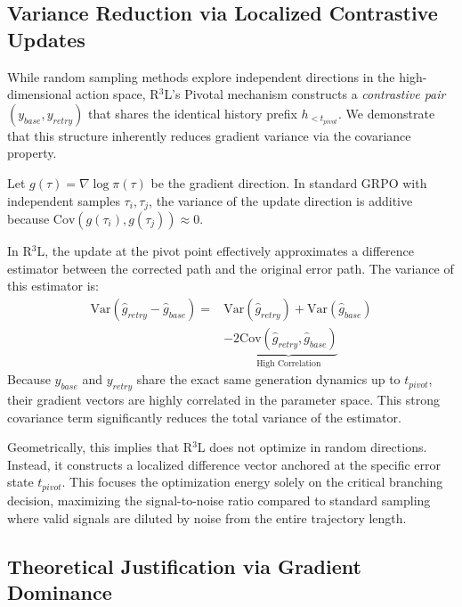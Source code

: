 \documentclass[11pt]{article}
\begin{document}
\subsection{Variance Reduction via Localized Contrastive Updates}
\label{sec:analysis_pivot}
While random sampling methods explore independent directions in the high-dimensional action space, R$^3$L's Pivotal mechanism constructs a \textit{contrastive pair} $(y_{base}, y_{retry})$ that shares the identical history prefix $h_{<t_{pivot}}$. We demonstrate that this structure inherently reduces gradient variance via the covariance property.

Let $g(\tau) = \nabla \log \pi(\tau)$ be the gradient direction. In standard GRPO with independent samples $\tau_i, \tau_j$, the variance of the update direction is additive because $\text{Cov}(g(\tau_i), g(\tau_j)) \approx 0$.

In R$^3$L, the update at the pivot point effectively approximates a difference estimator between the corrected path and the original error path. The variance of this estimator is:
\begin{equation}
\begin{split}
\text{Var}(\hat{g}_{retry} - \hat{g}_{base}) = &\text{Var}(\hat{g}_{retry}) + \text{Var}(\hat{g}_{base}) \\
&- 2 \underbrace{\text{Cov}(\hat{g}_{retry}, \hat{g}_{base})}_{\text{High Correlation}}
\end{split}
\end{equation}
Because $y_{base}$ and $y_{retry}$ share the exact same generation dynamics up to $t_{pivot}$, their gradient vectors are highly correlated in the parameter space. This strong covariance term significantly reduces the total variance of the estimator.

Geometrically, this implies that R$^3$L does not optimize in random directions. Instead, it constructs a localized difference vector anchored at the specific error state $t_{pivot}$. This focuses the optimization energy solely on the critical branching decision, maximizing the signal-to-noise ratio compared to standard sampling where valid signals are diluted by noise from the entire trajectory length.

\subsection{Theoretical Justification via Gradient Dominance}
\label{sec:gradient_dominance}
\end{document}
